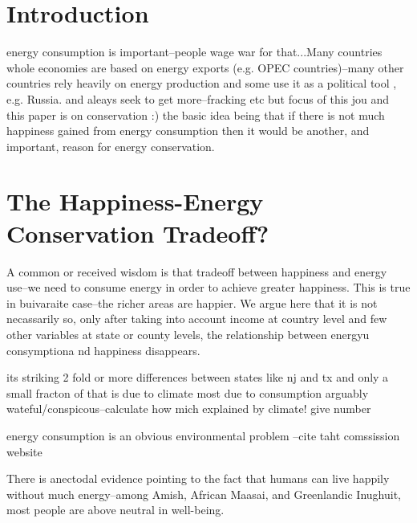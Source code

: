 \documentclass[10pt, letterpaper]{article}
\begin{document}
\begin{spacing}{1.4}



\section{Introduction}

energy consumption is important--people wage war for that...Many countries whole
economies are based on energy exports (e.g. OPEC countries)--many other
countries rely heavily on energy production and some use it as a political tool
, e.g. Russia. 
and aleays seek to get more--fracking etc
but focus of this jou and this paper is on conservation :)
the basic idea being that if there is not much happiness gained from energy
consumption then it would be another, and important, reason for energy
conservation. 


\section{The Happiness-Energy Conservation Tradeoff?}

A common or received wisdom is that tradeoff between happiness and energy
use--we need to consume energy in order to achieve greater happiness. This is
true in buivaraite case--the richer areas are happier.
 We argue
here that it is not necassarily so, only after taking into account income at
country level and few other variables at state or county levels, the
relationship between energyu consymptiona nd happiness disappears.


its striking 2 fold or more differences between states like nj and tx and only a
small fracton of that is due to climate most due to consumption arguably
wateful/conspicous--calculate how mich explained by climate! give number


 energy consumption is an obvious environmental problem
--cite taht comssission website

There is anectodal evidence pointing to the fact that humans can live happily
without much energy--among Amish, African Maasai, and Greenlandic Inughuit, most
people are above neutral in well-being.



\end{spacing}
\end{document}
